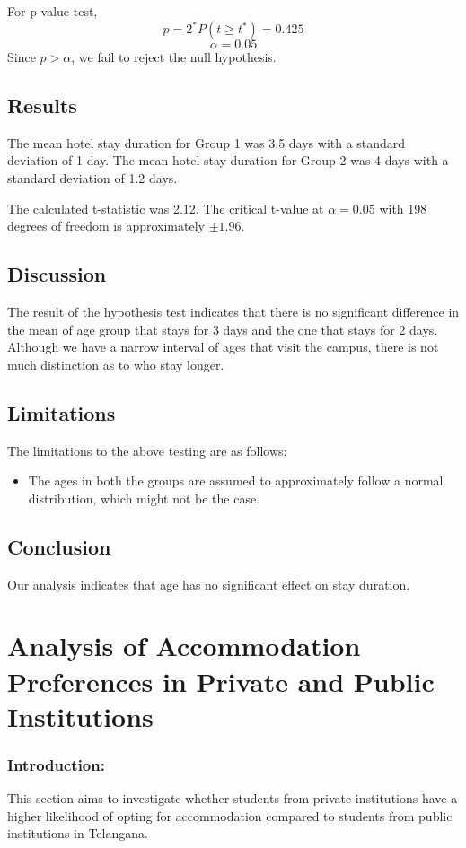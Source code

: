 \documentclass[oneside]{book}
\begin{document}
For p-value test,
\[p = 2^*P(t \geq t^*) = 0.425\]
\[\alpha = 0.05\]
Since $p > \alpha$, we fail to reject the null hypothesis.

\section{Results}
The mean hotel stay duration for Group 1 was 3.5 days with a standard deviation of 1 day. The mean hotel stay duration for Group 2 was 4 days with a standard deviation of 1.2 days.

The calculated t-statistic was 2.12. The critical t-value at $\alpha = 0.05$ with 198 degrees of freedom is approximately $\pm 1.96$.

\section{Discussion}
The result of the hypothesis test indicates that there is no significant difference in the mean of age group that stays for 3 days and the one that stays for 2 days. Although we have a narrow interval of ages that visit the campus, there is not much distinction as to who stay longer.

\section{Limitations}
The limitations to the above testing are as follows:
\begin{itemize}
    \item The ages in both the groups are assumed to approximately follow a normal distribution, which might not be the case.
    
\end{itemize}

\section{Conclusion}
Our analysis indicates that age has no significant effect on stay duration. 

\chapter{Analysis of Accommodation Preferences in Private and Public Institutions}

\subsection*{Introduction:}
This section aims to investigate whether students from private institutions have a higher likelihood of opting for accommodation compared to students from public institutions in Telangana.
\end{document}
